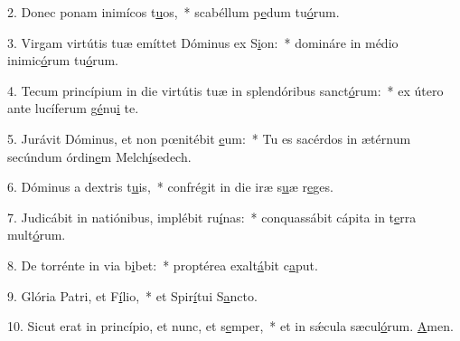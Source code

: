 2. Donec ponam inimícos t\uline{u}os,~* scabéllum p\uline{e}dum tu\uline{ó}rum.\par 
3. Virgam virtútis tuæ emíttet Dóminus ex S\uline{i}on:~* domináre in médio inimic\uline{ó}rum tu\uline{ó}rum.\par 
4. Tecum princípium in die virtútis tuæ in splendóribus sanct\uline{ó}rum:~* ex útero ante lucíferum g\uline{é}nu\uline{i} te.\par 
5. Jurávit Dóminus, et non pœnitébit \uline{e}um:~* Tu es sacérdos in ætérnum secúndum órdin\uline{e}m Melch\uline{í}sedech.\par 
6. Dóminus a dextris t\uline{u}is,~* confrégit in die iræ s\uline{u}æ r\uline{e}ges.\par 
7. Judicábit in natiónibus, implébit ru\uline{í}nas:~* conquassábit cápita in t\uline{e}rra mult\uline{ó}rum.\par 
8. De torrénte in via b\uline{i}bet:~* proptérea exalt\uline{á}bit c\uline{a}put.\par 
9. Glória Patri, et F\uline{í}lio,~* et Spir\uline{í}tui S\uline{a}ncto.\par 
10. Sicut erat in princípio, et nunc, et s\uline{e}mper,~* et in sǽcula sæcul\uline{ó}rum. \uline{A}men.\par 
